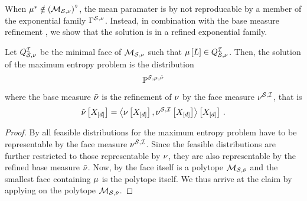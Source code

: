When $\mu^*\notin{\left(\mathcal{M}_{\mathcal{S},\nu}\right)}^{\circ}$, the mean paramater is by  not reproducable by a member of the exponential family $\Gamma^{\mathcal{S},\nu}$.
Instead, in combination with the base measure refinement , we show that the solution is in a refined exponential family.

\begin{theorem}
    \label{the:maxEntropyFace}
    Let $Q^{\mathcal{I}}_{\mathcal{S},\nu}$ be the minimal face of $\mathcal{M}_{\mathcal{S},\nu}$ such that $\mu\left[L\right]\in Q^{\mathcal{I}}_{\mathcal{S},\nu}$.
    Then, the solution of the maximum entropy problem is the distribution
    \begin{align*}
        \mathbb{P}^{\mathcal{S},\mu,\tilde{\nu}}
    \end{align*}
    where the base measure $\tilde{\nu}$ is the refinement of $\nu$ by the face measure $\nu^{\mathcal{S},\mathcal{I}}$, that is
    \begin{align*}
        \tilde{\nu}\left[X_{[d]}\right] = \left\langle \nu\left[X_{[d]}\right],\nu^{\mathcal{S},\mathcal{I}}\left[X_{[d]}\right]\right\rangle \left[ X_{[d]} \right] \, .
    \end{align*}
\end{theorem}
\begin{proof}
    By  all feasible distributions for the maximum entropy problem have to be representable by the face measure $\nu^{\mathcal{S},\mathcal{I}}$.
    Since the feasible distributions are further restricted to those representable by $\nu$, they are also representable by the refined base measure $\tilde{\nu}$.
    Now, by  the face itself is a polytope $\mathcal{M}_{\mathcal{S},\tilde{\nu}}$ and the smallest face containing $\mu$ is the polytope itself.
    We thus arrive at the claim by applying  on the polytope $\mathcal{M}_{\mathcal{S},\tilde{\nu}}$.
\end{proof}


